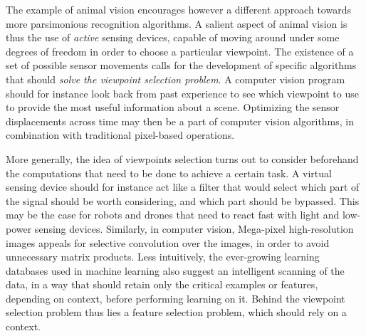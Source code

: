 \documentclass{article} %
\begin{document}
	The example of animal vision encourages however a different approach towards more parsimonious recognition algorithms. A salient aspect of animal vision is thus the use of \emph{active} sensing devices, capable of moving around under some degrees of freedom in order to choose a particular viewpoint. The existence of a set of possible sensor movements calls for the development of specific algorithms that should \emph{solve the viewpoint selection problem}. A computer vision program should for instance look back from past experience to see which viewpoint to use to provide the most useful information about a scene. Optimizing the sensor displacements across time may then be a part of computer vision algorithms, in combination with traditional pixel-based operations. 
	
	More generally, the idea of viewpoints selection turns out to consider beforehand the computations that need to be done to achieve a certain task. A virtual sensing device should for instance act like a filter that would select which part of the signal should be worth considering, and which part should be bypassed. 
	This may be the case for robots and drones  that need to react fast with light and low-power sensing devices. Similarly, in computer vision, Mega-pixel high-resolution images appeals for selective convolution over the images, in order to avoid unnecessary matrix products. Less intuitively, the ever-growing  learning databases used in machine learning also suggest an intelligent scanning of the data, in a way that should retain only the critical examples or features, depending on context, before performing learning on it.  
	Behind the viewpoint selection problem thus lies a feature selection problem, which should rely on a context. 
	
	
	
	
\end{document}
